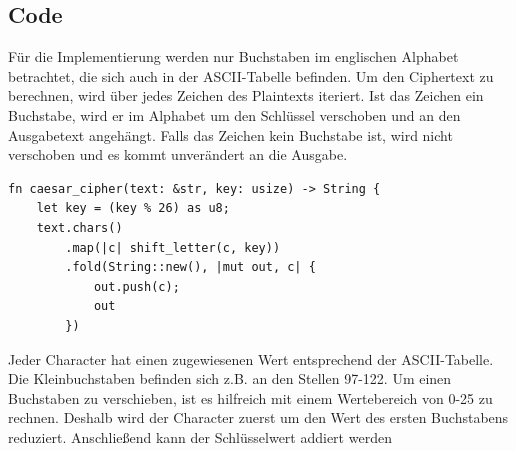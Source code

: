 \documentclass{article}
\begin{document}
    \subsection{Code}
    Für die Implementierung werden nur Buchstaben im englischen Alphabet betrachtet, die sich auch in der ASCII-Tabelle befinden.
    Um den Ciphertext zu berechnen, wird über jedes Zeichen des Plaintexts iteriert. Ist das Zeichen ein Buchstabe, wird
    er im Alphabet um den Schlüssel verschoben und an den Ausgabetext angehängt. Falls das Zeichen kein Buchstabe ist, wird 
    nicht verschoben und es kommt unverändert an die Ausgabe.
    \begin{verbatim}
fn caesar_cipher(text: &str, key: usize) -> String {
    let key = (key % 26) as u8;
    text.chars()
        .map(|c| shift_letter(c, key))
        .fold(String::new(), |mut out, c| {
            out.push(c);
            out
        })
    \end{verbatim}
    Jeder Character hat einen zugewiesenen Wert entsprechend der ASCII-Tabelle. Die Kleinbuchstaben befinden sich z.B. an
    den Stellen 97-122. Um einen Buchstaben zu verschieben, ist es hilfreich mit einem Wertebereich von 0-25 zu rechnen.
    Deshalb wird der Character zuerst um den Wert des ersten Buchstabens reduziert. Anschließend kann der Schlüsselwert
    addiert werden 
\end{document}
